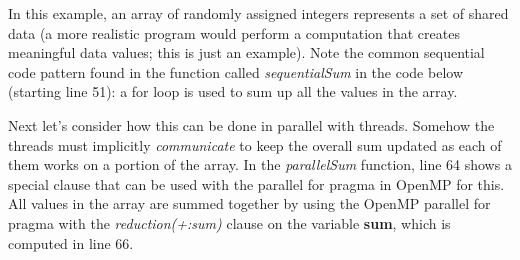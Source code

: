 \documentclass[letterpaper,10pt,openany,oneside]{sphinxmanual}
\begin{document}
In this example, an array of randomly assigned integers represents a set of shared data (a more realistic program would perform a computation
that creates meaningful data values; this is just an example).
Note the common sequential code pattern found in the function called \emph{sequentialSum} in the code
below (starting line 51): a for loop is used to sum up all the values in the array.

Next let's consider how this can be done in parallel with threads.
Somehow the threads must implicitly \emph{communicate} to keep the overall sum updated
as each of them works on a portion of the array.
In the \emph{parallelSum} function, line 64 shows a special clause that
can be used with the parallel for pragma in OpenMP for this. All values
in the array are summed together by using the OpenMP
parallel for pragma with the \emph{reduction(+:sum)} clause on the variable \textbf{sum},
which is computed in line 66.
\end{document}
